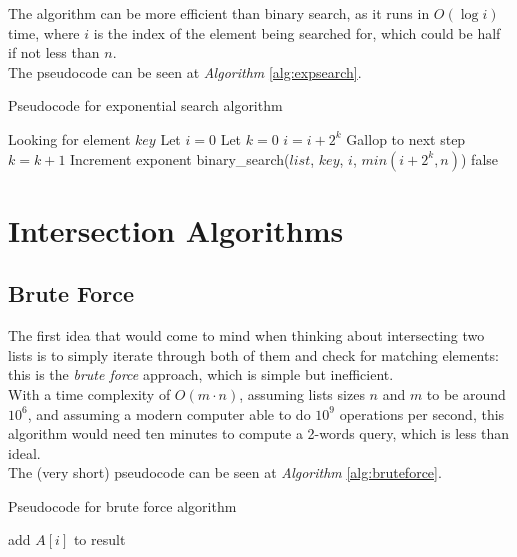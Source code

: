 The algorithm can be more efficient than binary search, as it runs in $O(\log i)$ time, where $i$ is the index of the element being searched for, which could be half if not less than $n$.\\
The pseudocode can be seen at \textit{Algorithm} \ref{alg:expsearch}.

\begin{algorithm}
    \captionsetup{labelsep=newline}
    \caption{Pseudocode for exponential search algorithm \label{alg:expsearch}}
    \begin{algorithmic}[1]
        \State Looking for element $key$
        \State Let $i=0$ 
        \State Let $k=0$
            \State $i=i+2^k$ \Comment Gallop to next step
            \State $k=k+1$ \Comment Increment exponent
        \EndWhile
            \State binary\_search($list$, $key$, $i$, $min(i+2^k,n)$) 
        \Else
            \State \Return false 
        \EndIf
    \end{algorithmic}
\end{algorithm}

\section{Intersection Algorithms}

\subsection{Brute Force \label{sec:bruteforce}}

The first idea that would come to mind when thinking about intersecting two lists is to simply iterate through both of them and check for matching elements: this is the \textit{brute force} approach, which is simple but inefficient. \\
With a time complexity of $O(m \cdot n)$, assuming lists sizes $n$ and $m$ to be around $10^6$, and assuming a modern computer able to do $10^9$ operations per second, this algorithm would need ten minutes to compute a 2-words query, which is less than ideal.\\
The (very short) pseudocode can be seen at \textit{Algorithm} \ref{alg:bruteforce}.

\begin{algorithm}
    \captionsetup{labelsep=newline}
    \caption{Pseudocode for brute force algorithm \label{alg:bruteforce}}
    \begin{algorithmic}[1]
                    \State add $A[i]$ to result
                \EndIf
            \EndFor
        \EndFor
    \end{algorithmic}
\end{algorithm}

